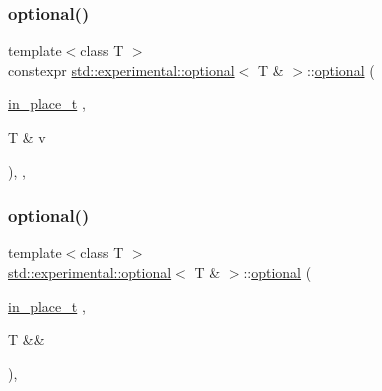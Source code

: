 \mbox{\label{classstd_1_1experimental_1_1optional_3_01_t_01_6_01_4_a5c5cac399d59bc9d499a369367110289}} 
\subsubsection{\texorpdfstring{optional()}{optional()}\hspace{0.1cm}{\footnotesize\ttfamily [6/7]}}
{\footnotesize\ttfamily template$<$class T $>$ \\
constexpr \mbox{\hyperlink{classstd_1_1experimental_1_1optional}{std\+::experimental\+::optional}}$<$ T \& $>$\+::\mbox{\hyperlink{classstd_1_1experimental_1_1optional}{optional}} (\begin{DoxyParamCaption}\item[{\mbox{\hyperlink{structstd_1_1experimental_1_1in__place__t}{in\+\_\+place\+\_\+t}}}]{,  }\item[{T \&}]{v }\end{DoxyParamCaption})\hspace{0.3cm}{\ttfamily [inline]}, {\ttfamily [explicit]}, {\ttfamily [noexcept]}}

\mbox{\label{classstd_1_1experimental_1_1optional_3_01_t_01_6_01_4_accb8a2372c834051b76329222d6e737f}} 
\subsubsection{\texorpdfstring{optional()}{optional()}\hspace{0.1cm}{\footnotesize\ttfamily [7/7]}}
{\footnotesize\ttfamily template$<$class T $>$ \\
\mbox{\hyperlink{classstd_1_1experimental_1_1optional}{std\+::experimental\+::optional}}$<$ T \& $>$\+::\mbox{\hyperlink{classstd_1_1experimental_1_1optional}{optional}} (\begin{DoxyParamCaption}\item[{\mbox{\hyperlink{structstd_1_1experimental_1_1in__place__t}{in\+\_\+place\+\_\+t}}}]{,  }\item[{T \&\&}]{ }\end{DoxyParamCaption})\hspace{0.3cm}{\ttfamily [explicit]}, {\ttfamily [delete]}}

